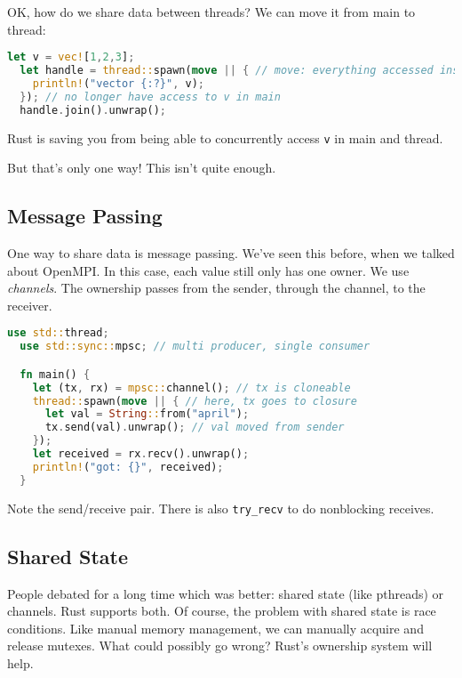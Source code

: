 OK, how do we share data between threads? We can move it from main to thread:
\begin{lstlisting}[language=Rust]
  let v = vec![1,2,3];
  let handle = thread::spawn(move || { // move: everything accessed inside closure is moved
    println!("vector {:?}", v);
  }); // no longer have access to v in main
  handle.join().unwrap();
\end{lstlisting}
Rust is saving you from being able to concurrently access {\tt v} in main and thread.

But that's only one way! This isn't quite enough.

\subsection*{Message Passing}
One way to share data is message passing. We've seen this before, when we talked about OpenMPI.
In this case, each value still only has one owner. We use \emph{channels}. The ownership passes
from the sender, through the channel, to the receiver.
\begin{lstlisting}[language=Rust]
  use std::thread;
  use std::sync::mpsc; // multi producer, single consumer

  fn main() {
    let (tx, rx) = mpsc::channel(); // tx is cloneable
    thread::spawn(move || { // here, tx goes to closure
      let val = String::from("april");
      tx.send(val).unwrap(); // val moved from sender
    });
    let received = rx.recv().unwrap();
    println!("got: {}", received);
  }
\end{lstlisting}
Note the send/receive pair. There is also {\tt try\_recv} to do nonblocking receives.

\subsection*{Shared State}
People debated for a long time which was better: shared state (like pthreads) or channels.
Rust supports both. Of course, the problem with shared state is race conditions.
Like manual memory management, we can manually acquire and release mutexes. What could
possibly go wrong? Rust's ownership system will help.

